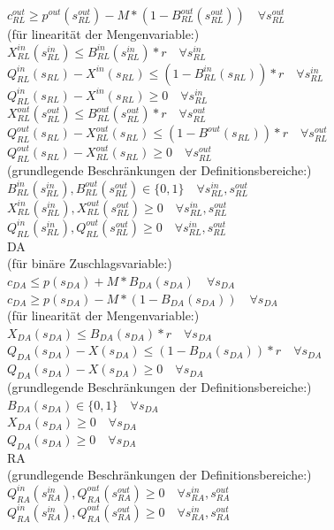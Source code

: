 \documentclass{article}
\begin{document}
        $c^{out}_{RL} \geq p^{out}(s^{out}_{RL}) - M * (1 - B^{out}_{RL}(s^{out}_{RL}))\quad\forall s^{out}_{RL}$  \\
        (für linearität der Mengenvariable:)\\
        $X^{in}_{RL}(s^{in}_{RL}) \leq B^{in}_{RL}(s^{in}_{RL}) * r \quad\forall s^{in}_{RL}$\\
        $Q^{in}_{RL}(s_{RL}) - X^{in}(s_{RL}) \leq (1 - B^{in}_{RL}(s_{RL})) * r \quad\forall s^{in}_{RL}$\\
        $Q^{in}_{RL}(s_{RL}) - X^{in}(s_{RL}) \geq 0 \quad\forall s^{in}_{RL}$\\
        $X^{out}_{RL}(s^{out}_{RL}) \leq B^{out}_{RL}(s^{out}_{RL}) * r \quad\forall s^{out}_{RL}$\\
        $Q^{out}_{RL}(s_{RL}) - X^{out}_{RL}(s_{RL}) \leq (1 - B^{out}(s_{RL})) * r \quad\forall s^{out}_{RL}$\\
        $Q^{out}_{RL}(s_{RL}) - X^{out}_{RL}(s_{RL}) \geq 0\quad\forall s^{out}_{RL} $\\
        (grundlegende Beschränkungen der Definitionsbereiche:)\\
        $B^{in}_{RL}(s^{in}_{RL}),B^{out}_{RL}(s^{out}_{RL}) \in \{0,1\}\quad\forall s^{in}_{RL},s^{out}_{RL} $\\
        $X^{in}_{RL}(s^{in}_{RL}),X^{out}_{RL}(s^{out}_{RL}) \geq 0 \quad\forall s^{in}_{RL},s^{out}_{RL} $\\
        $Q^{in}_{RL}(s^{in}_{RL}),Q^{out}_{RL}(s^{out}_{RL}) \geq 0\quad\forall  s^{in}_{RL},s^{out}_{RL} $\\
DA\\
        (für binäre Zuschlagsvariable:)\\
        $c_{DA} \leq p(s_{DA}) + M * B_{DA}(s_{DA})\quad\forall s_{DA} $ \\
        $c_{DA} \geq p(s_{DA}) - M * (1 - B_{DA}(s_{DA}))\quad\forall s_{DA} $ \\
        (für linearität der Mengenvariable:)\\
        $X_{DA}(s_{DA}) \leq B_{DA}(s_{DA}) * r \quad\forall s_{DA}$\\
        $Q_{DA}(s_{DA}) - X(s_{DA}) \leq (1 - B_{DA}(s_{DA})) * r \quad\forall s_{DA}$\\
        $Q_{DA}(s_{DA}) - X(s_{DA}) \geq 0 \quad\forall s_{DA}$\\
        (grundlegende Beschränkungen der Definitionsbereiche:)\\
        $B_{DA}(s_{DA})\in \{0,1\}\quad\forall s_{DA} $\\
        $X_{DA}(s_{DA}) \geq 0 \quad\forall s_{DA} $\\
        $Q_{DA}(s_{DA}) \geq 0\quad\forall  s_{DA} $\\
RA\\
	(grundlegende Beschränkungen der Definitionsbereiche:)
	$Q^{in}_{RA}(s^{in}_{RA}),Q^{out}_{RA}(s^{out}_{RA}) \geq 0 \quad\forall s^{in}_{RA},s^{out}_{RA} $\\
	$Q^{in}_{RA}(s^{in}_{RA}),Q^{out}_{RA}(s^{out}_{RA}) \geq 0\quad\forall  s^{in}_{RA},s^{out}_{RA} $\\
\end{document}
